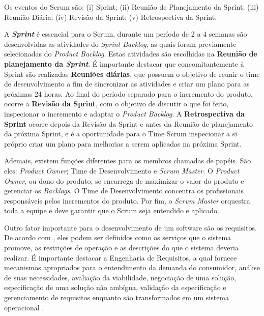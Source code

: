Os eventos do Scrum são: (i) Sprint; (ii) Reunião de Planejamento da Sprint; (iii) Reunião Diária; (iv) Revisão da Sprint; (v) Retrospectiva da Sprint.

A \textbf{\textit{Sprint}} é essencial para o Scrum, durante um período de 2 a 4 semanas são desenvolvidas as atividades do \textit{Sprint Backlog}, as quais foram previamente selecionadas do \textit{Product Backlog}. Estas atividades são escolhidas na \textbf{Reunião de planejamento da \textit{Sprint}}. É importante destacar que concomitantemente à Sprint são realizadas \textbf{Reuniões diárias}, que possuem o objetivo de reunir o time de desenvolvimento a fim de sincronizar as atividades e criar um plano para as próximas 24 horas. Ao final do período separado para o incremento do produto, ocorre a \textbf{Revisão da Sprint}, com o objetivo de discutir o que foi feito, inspecionar o incremento e adaptar o \textit{Product Backlog}. A \textbf{Retrospectiva da Sprint} ocorre depois da Revisão da Sprint e antes da Reunião de planejamento da próxima Sprint, e é a oportunidade para o Time Scrum inspecionar a si próprio criar um plano para melhorias a serem aplicadas na próxima Sprint.

Ademais, existem funções diferentes para os membros chamadas de papéis. São eles: \textit{Product Owner}; Time de Desenvolvimento e \textit{Scrum Master}. 
O \textit{Product Owner}, ou dono do produto, se encarrega de maximizar o valor do produto e gerenciar os \textit{Backlogs}. O Time de Desenvolvimento concentra os profissionais responsáveis pelos incrementos do produto. Por fim, o \textit{Scrum Master} orquestra toda a equipe e deve garantir que o Scrum seja entendido e aplicado.

Outro fator importante para o desenvolvimento de um software são os requisitos. De acordo com \cite{Sommervile2010}, eles podem ser definidos como os serviços que o sistema promove, as restrições de operação e as descrições do que o sistema deveria realizar. É importante destacar a Engenharia de Requisitos, a qual fornece mecanismos apropriados para o entendimento da demanda do consumidor, análise de suas necessidades, avaliação da viabilidade, negociação de uma solução, especificação de uma solução não ambígua, validação da especificação e gerenciamento de requisitos enquanto são transformados em um sistema operacional \citep{Pressman2014}. 

